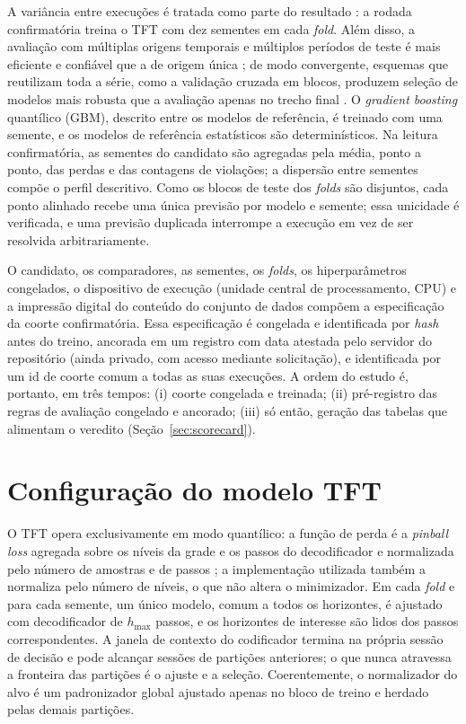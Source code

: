A variância entre execuções é tratada como parte do resultado \cite{BOUTHILLIER2021}: a rodada confirmatória treina o TFT com dez sementes em cada \textit{fold}. Além disso, a avaliação com múltiplas origens temporais e múltiplos períodos de teste é mais eficiente e confiável que a de origem única \cite{TASHMAN2000}; de modo convergente, esquemas que reutilizam toda a série, como a validação cruzada em blocos, produzem seleção de modelos mais robusta que a avaliação apenas no trecho final \cite{BERGMEIR2012}. O \textit{gradient boosting} quantílico (GBM), descrito entre os modelos de referência, é treinado com uma semente, e os modelos de referência estatísticos são determinísticos. Na leitura confirmatória, as sementes do candidato são agregadas pela média, ponto a ponto, das perdas e das contagens de violações; a dispersão entre sementes compõe o perfil descritivo. Como os blocos de teste dos \textit{folds} são disjuntos, cada ponto alinhado recebe uma única previsão por modelo e semente; essa unicidade é verificada, e uma previsão duplicada interrompe a execução em vez de ser resolvida arbitrariamente.

O candidato, os comparadores, as sementes, os \textit{folds}, os hiperparâmetros congelados, o dispositivo de execução (unidade central de processamento, CPU) e a impressão digital do conteúdo do conjunto de dados compõem a especificação da coorte confirmatória. Essa especificação é congelada e identificada por \textit{hash} antes do treino, ancorada em um registro com data atestada pelo servidor do repositório (ainda privado, com acesso mediante solicitação), e identificada por um id de coorte comum a todas as suas execuções. A ordem do estudo é, portanto, em três tempos: (i) coorte congelada e treinada; (ii) pré-registro das regras de avaliação congelado e ancorado; (iii) só então, geração das tabelas que alimentam o veredito (Seção~\ref{sec:scorecard}).

\section{Configuração do modelo TFT} \label{sec:tft}
O TFT opera exclusivamente em modo quantílico: a função de perda é a \textit{pinball loss} agregada sobre os níveis da grade e os passos do decodificador e normalizada pelo número de amostras e de passos \cite[Eq.~24]{LIMETAL2021TFT}; a implementação utilizada também a normaliza pelo número de níveis, o que não altera o minimizador. Em cada \textit{fold} e para cada semente, um único modelo, comum a todos os horizontes, é ajustado com decodificador de \(h_{\max}\) passos, e os horizontes de interesse são lidos dos passos correspondentes. A janela de contexto do codificador termina na própria sessão de decisão e pode alcançar sessões de partições anteriores; o que nunca atravessa a fronteira das partições é o ajuste e a seleção. Coerentemente, o normalizador do alvo é um padronizador global ajustado apenas no bloco de treino e herdado pelas demais partições.

